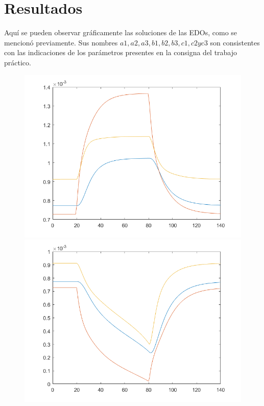 \section{Resultados}

\hspace{1cm}Aqu\'i se pueden observar gr\'aficamente las soluciones de las EDOs, como se mencion\'o previamente. Sus nombres $a1, a2, a3, b1, b2, b3, c1, c2 y c3$ son consistentes con las indicaciones de los par\'ametros presentes en la consigna del trabajo pr\'actico.
\begin{figure}[h!]
\centering
\includegraphics[scale=0.3]{../a1.png}\hspace{0.01cm}
\includegraphics[scale=0.3]{../b1.png}\hspace{0.01cm}

\end{figure}
